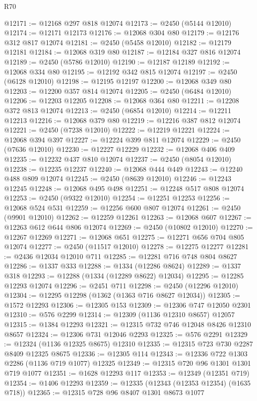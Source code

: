 \begin{lexlean}{R70}
\begin{coremodule}
@12171 := @12168 @297 @818 @12074
@12173 := @2450 (@5144 @12010)
@12174 := @12171 @12173
@12176 := @12068 @304 @80
@12179 := @12176 @312 @817 @12074
@12181 := @2450 (@5458 @12010)
@12182 := @12179 @12181
@12184 := @12068 @319 @80
@12187 := @12184 @327 @816 @12074
@12189 := @2450 (@5786 @12010)
@12190 := @12187 @12189
@12192 := @12068 @334 @80
@12195 := @12192 @342 @815 @12074
@12197 := @2450 (@6128 @12010)
@12198 := @12195 @12197
@12200 := @12068 @349 @80
@12203 := @12200 @357 @814 @12074
@12205 := @2450 (@6484 @12010)
@12206 := @12203 @12205
@12208 := @12068 @364 @80
@12211 := @12208 @372 @813 @12074
@12213 := @2450 (@6854 @12010)
@12214 := @12211 @12213
@12216 := @12068 @379 @80
@12219 := @12216 @387 @812 @12074
@12221 := @2450 (@7238 @12010)
@12222 := @12219 @12221
@12224 := @12068 @394 @397
@12227 := @12224 @399 @811 @12074
@12229 := @2450 (@7636 @12010)
@12230 := @12227 @12229
@12232 := @12068 @406 @409
@12235 := @12232 @437 @810 @12074
@12237 := @2450 (@8054 @12010)
@12238 := @12235 @12237
@12240 := @12068 @444 @449
@12243 := @12240 @488 @809 @12074
@12245 := @2450 (@8639 @12010)
@12246 := @12243 @12245
@12248 := @12068 @495 @498
@12251 := @12248 @517 @808 @12074
@12253 := @2450 (@9322 @12010)
@12254 := @12251 @12253
@12256 := @12068 @524 @531
@12259 := @12256 @600 @807 @12074
@12261 := @2450 (@9901 @12010)
@12262 := @12259 @12261
@12263 := @12068 @607
@12267 := @12263 @612 @644 @806 @12074
@12269 := @2450 (@10802 @12010)
@12270 := @12267 @12269
@12271 := @12068 @651
@12275 := @12271 @656 @704 @805 @12074
@12277 := @2450 (@11517 @12010)
@12278 := @12275 @12277
@12281 := @2436 @12034 @12010 @711
@12285 := @12281 @716 @748 @804 @8627
@12286 := @1337 @333
@12288 := @1334 (@12286 @8624)
@12289 := @1337 @318
@12293 := @12288 (@1334 (@12289 @8622) @12034)
@12295 := @12285 @12293 @12074
@12296 := @2451 @711
@12298 := @2450 (@12296 @12010)
@12304 := @12295 @12298 (@1362 (@1363 @716 @8627 @12034))
@12305 := @1572 @12293
@12306 := @12305 @153
@12309 := @12306 @747 @12050 @2301
@12310 := @576 @2299
@12314 := @12309 (@1136 @12310 @8657) @12057
@12315 := @1384 @12293
@12321 := @12315 @732 @746 @12048 @8426 @12310 @8657
@12324 := @12306 @731 @12046 @2293
@12325 := @576 @2291
@12329 := @12324 (@1136 @12325 @8675) @12310
@12335 := @12315 @723 @730 @2287 @8409 @12325 @8675
@12336 := @12305 @114
@12343 := @12336 @722 @1303 @2286 (@1136 @719 @1077) @12325
@12349 := @12315 @720 @96 @1301 @1301 @719 @1077
@12351 := @1628 @12293 @117
@12353 := @12349 (@12351 @719)
@12354 := @1406 @12293
@12359 := @12335 (@12343 (@12353 @12354) (@1635 @718))
@12365 := @12315 @728 @96 @8407 @1301 @8673 @1077

\end{coremodule}
\end{lexlean}
